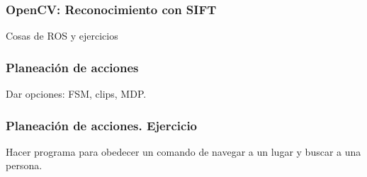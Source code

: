 \documentclass[10pt,spanish,aspectratio=1610]{beamer}
\begin{document}
\begin{frame}\frametitle{OpenCV: Reconocimiento con SIFT}
  Cosas de ROS y ejercicios
\end{frame}

\begin{frame}\frametitle{Planeación de acciones}
Dar opciones: FSM, clips, MDP.  
\end{frame}

\begin{frame}\frametitle{Planeación de acciones. Ejercicio}
Hacer programa para obedecer un comando de navegar a un lugar y buscar a una persona.
\end{frame}
\end{document}
